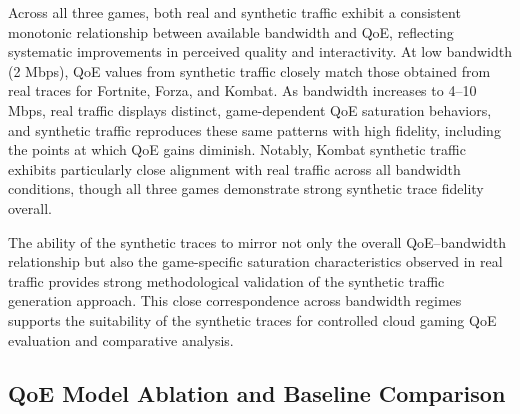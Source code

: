 Across all three games, both real and synthetic traffic exhibit a consistent monotonic relationship between available bandwidth and QoE, reflecting systematic improvements in perceived quality and interactivity. At low bandwidth (2 Mbps), QoE values from synthetic traffic closely match those obtained from real traces for Fortnite, Forza, and Kombat. As bandwidth increases to 4–10 Mbps, real traffic displays distinct, game-dependent QoE saturation behaviors, and synthetic traffic reproduces these same patterns with high fidelity, including the points at which QoE gains diminish. Notably, Kombat synthetic traffic exhibits particularly close alignment with real traffic across all bandwidth conditions, though all three games demonstrate strong synthetic trace fidelity overall.

The ability of the synthetic traces to mirror not only the overall QoE–bandwidth relationship but also the game-specific saturation characteristics observed in real traffic provides strong methodological validation of the synthetic traffic generation approach. This close correspondence across bandwidth regimes supports the suitability of the synthetic traces for controlled cloud gaming QoE evaluation and comparative analysis.


\label{sec:experiments_and_results}


\subsection{QoE Model Ablation and Baseline Comparison}
\label{subsec:qoe_ablation}

